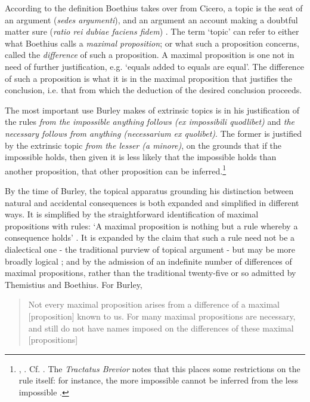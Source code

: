 \documentclass[]{birkjour}
\begin{document}
According to the definition Boethius takes over from Cicero, a topic is the seat of an argument (\textit{sedes argumenti}), and an argument an account making a doubtful matter sure (\textit{ratio rei dubiae faciens fidem}) \autocite[p. 1048]{BTC}. The term `topic' can refer to either what Boethius calls a \textit{maximal proposition}; or what such a proposition concerns, called the \textit{difference} of such a proposition. A maximal proposition is one not in need of further justification, e.g. `equals added to equals are equal'. The difference of such a proposition is what it is in the maximal proposition that justifies the conclusion, i.e. that from which the deduction of the desired conclusion proceeds.

The most important use Burley makes of extrinsic topics is in his justification of the rules \textit{from the impossible anything follows (ex impossibili quodlibet)} and \textit{the necessary follows from anything (necessarium ex quolibet)}. The former is justified by the extrinsic topic \textit{from the lesser (a minore)}, on the grounds that if the impossible holds, then given it is less likely that the impossible holds than another proposition, that other proposition can be inferred.\footnote{\autocite[pp. 128-129, par. 70]{Green-Pedersen1980b}, \autocite[p. 61]{BurleyDPAL}. Cf. \autocite[III-3. 38, pp. 727-731]{OckhamSL}. The \textit{Tractatus Brevior} notes that this places some restrictions on the rule itself: for instance, the more impossible cannot be inferred from the less impossible \autocite[pp. 248.19-249.3]{BurleyDPAL}.}

By the time of Burley, the topical apparatus grounding his distinction between natural and accidental consequences is both expanded and simplified in different ways. It is simplified by the straightforward identification of maximal propositions with rules: `A maximal proposition is nothing but a rule whereby a consequence holds' \autocite[p. 76]{BurleyDPAL}. It is expanded by the claim that such a rule need not be a dialectical one - the traditional purview of topical argument - but may be more broadly logical \autocite[p. 76]{BurleyDPAL}; and by the admission of an indefinite number of differences of maximal propositions, rather than the traditional twenty-five or so admitted by Themistius and Boethius. For Burley,
\begin{quote}
	Not every maximal proposition arises from a difference of a maximal [proposition] known to us. For many maximal propositions are necessary, and still do not have names imposed on the differences of these maximal [propositions] \autocite[pp. 76-77]{BurleyDPAL}
\end{quote}
\end{document}
